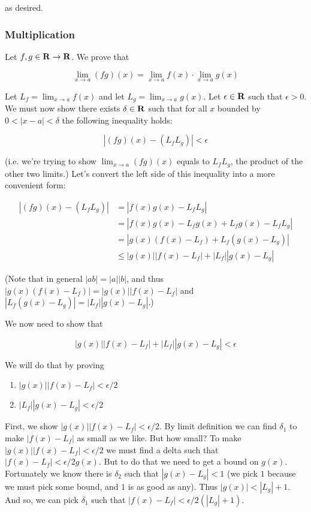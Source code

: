 as desired.

\subsubsection*{Multiplication}

Let $f,g\in\mathbf{R}\to\mathbf{R}$. We prove that

\[\lim_{x\to a}(fg)(x)=\lim_{x\to a}f(x)\cdot\lim_{x\to a}g(x)\]

Let $L_f=\lim_{x\to a}f(x)$ and let $L_g=\lim_{x\to a}g(x)$. Let
$\epsilon\in\mathbf{R}$ such that $\epsilon>0$. We must now show there exists
$\delta\in\mathbf{R}$ such that for all $x$ bounded by $0<|x-a|<\delta$ the following
inequality holds:

\[|(fg)(x)-(L_fL_g)|<\epsilon\]

(i.e. we're trying to show $\lim_{x\to a}(fg)(x)$ equals to $L_fL_g$,
the product of the other two limits.) Let's convert the left side of
this inequality into a more convenient form:

\begin{align*}
    |(fg)(x)-(L_fL_g)|&=|f(x)g(x)-L_fL_g|\\
    &=|f(x)g(x)-L_fg(x)+L_fg(x)-L_fL_g|\\
    &=|g(x)(f(x)-L_f)+L_f(g(x)-L_g)|\\
    &\leq |g(x)||f(x)-L_f|+|L_f||g(x)-L_g|
\end{align*}

(Note that in general $|ab|=|a||b|$, and thus
$|g(x)(f(x)-L_f)|=|g(x)||f(x)-L_f|$ and
$|L_f(g(x)-L_g)|=|L_f||g(x)-L_g|$.)

\vs

We now need to show that

\[|g(x)||f(x)-L_f|+|L_f||g(x)-L_g|<\epsilon\]

We will do that by proving

\begin{enumerate}
    \item $|g(x)||f(x)-L_f|<\epsilon/2$
    \item $|L_f||g(x)-L_g|<\epsilon/2$
\end{enumerate}

First, we show $|g(x)||f(x)-L_f|<\epsilon/2$. By limit definition we can find
$\delta_1$ to make $|f(x)-L_f|$ as small as we like. But how small? To make
$|g(x)||f(x)-L_f|<\epsilon/2$ we must find a delta such that
$|f(x)-L_f|<\epsilon/2g(x)$. But to do that we need to get a bound on
$g(x)$. Fortunately we know there is $\delta_2$ such that
$|g(x)-L_g|<1$ (we pick $1$ because we must pick some bound, and $1$
is as good as any). Thus $|g(x)|<|L_g|+1$. And so, we can pick
$\delta_1$ such that $|f(x)-L_f|<\epsilon/2(|L_g|+1)$.

